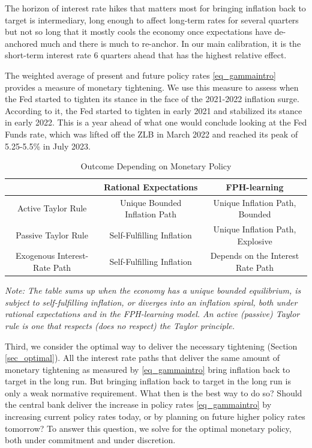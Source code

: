 \documentclass{article}
\begin{document}
The horizon of interest rate hikes that matters most for bringing inflation back to target is intermediary, long enough to affect long-term rates for several quarters but not so long that it mostly cools the economy once expectations have de-anchored much and there is much to re-anchor. In our main calibration, it is the short-term interest rate 6 quarters ahead that has the highest relative effect.

The weighted average of present and future policy rates \eqref{eq_gammaintro} provides a measure of monetary tightening. We use this measure to assess when the Fed started to tighten its stance in the face of the 2021-2022 inflation surge. According to it, the Fed started to tighten in early 2021 and stabilized its stance in early 2022. This is a year ahead of what one would conclude looking at the Fed Funds rate, which was lifted off the ZLB in March 2022 and reached its peak of 5.25-5.5\% in July 2023.

\begin{table}
	\begin{center}
		\caption{Outcome Depending on Monetary Policy}\label{table_sumup}
		\begin{tabular}{ c|c|c }
			& Rational Expectations & FPH-learning \\
			\hline
			Active Taylor Rule & Unique Bounded Inflation Path & Unique Inflation Path, Bounded \\
			\hline
			Passive Taylor Rule & Self-Fulfilling Inflation & Unique Inflation Path, Explosive \\
			\hline
			Exogenous Interest-Rate Path & Self-Fulfilling Inflation & Depends on the Interest Rate Path \\
			\hline
		\end{tabular}
	\begin{minipage}[c]{6.0in}
	\footnotesize \baselineskip=11pt \vspace{5pt}
	\emph{Note: The table sums up when the economy has a unique bounded equilibrium, is subject to self-fulfilling inflation, or diverges into an inflation spiral, both under rational expectations and in the FPH-learning model. An active (passive) Taylor rule is one that respects (does no respect) the Taylor principle.} 
\end{minipage}
	\end{center}
\end{table}

Third, we consider the optimal way to deliver the necessary tightening (Section \ref{sec_optimal}).
All the interest rate paths that deliver the same amount of monetary tightening as measured by \eqref{eq_gammaintro} bring inflation back to target in the long run. But bringing inflation back to target in the long run is only a weak normative requirement. What then is the best way to do so? Should the central bank deliver the increase in policy rates \eqref{eq_gammaintro} by increasing current policy rates today, or by planning on future higher policy rates tomorrow? To answer this question, we solve for the optimal monetary policy, both under commitment and under discretion.
\end{document}
